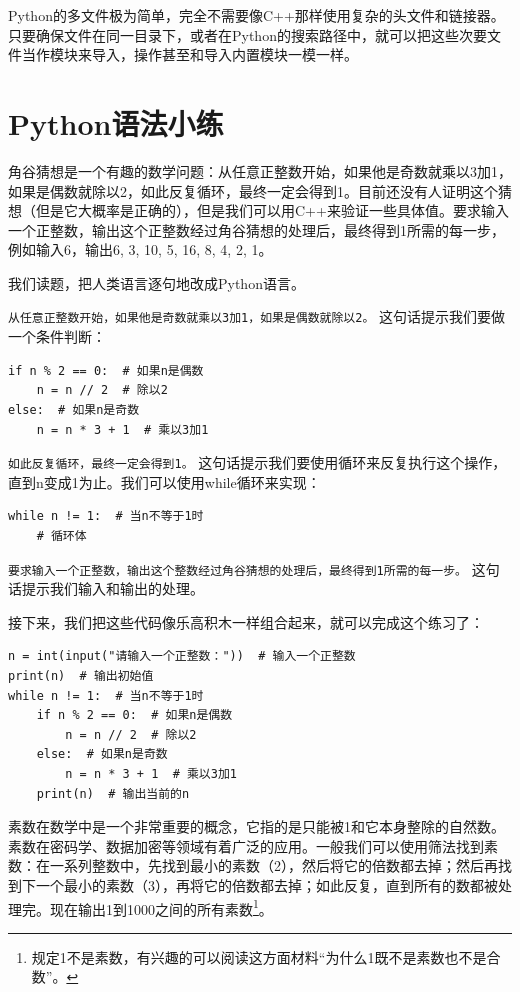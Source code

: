Python的多文件极为简单，完全不需要像C++那样使用复杂的头文件和链接器。只要确保文件在同一目录下，或者在Python的搜索路径中，就可以把这些次要文件当作模块来导入，操作甚至和导入内置模块一模一样。

\section{Python语法小练}

\begin{example}
  角谷猜想是一个有趣的数学问题：从任意正整数开始，如果他是奇数就乘以3加1，如果是偶数就除以2，如此反复循环，最终一定会得到1。目前还没有人证明这个猜想（但是它大概率是正确的），但是我们可以用C++来验证一些具体值。要求输入一个正整数，输出这个正整数经过角谷猜想的处理后，最终得到1所需的每一步，例如输入6，输出6, 3, 10, 5, 16, 8, 4, 2, 1。
\end{example}

\begin{answer}
  我们读题，把人类语言逐句地改成Python语言。

   \texttt{从任意正整数开始，如果他是奇数就乘以3加1，如果是偶数就除以2。} 这句话提示我们要做一个条件判断：
\begin{verbatim}
if n % 2 == 0:  # 如果n是偶数
    n = n // 2  # 除以2
else:  # 如果n是奇数
    n = n * 3 + 1  # 乘以3加1
\end{verbatim}
   \texttt{如此反复循环，最终一定会得到1。} 这句话提示我们要使用循环来反复执行这个操作，直到n变成1为止。我们可以使用while循环来实现：
\begin{verbatim}
while n != 1:  # 当n不等于1时
    # 循环体
\end{verbatim}

   \texttt{要求输入一个正整数，输出这个整数经过角谷猜想的处理后，最终得到1所需的每一步。} 这句话提示我们输入和输出的处理。

  接下来，我们把这些代码像乐高积木一样组合起来，就可以完成这个练习了：
\begin{verbatim}
n = int(input("请输入一个正整数："))  # 输入一个正整数
print(n)  # 输出初始值
while n != 1:  # 当n不等于1时
    if n % 2 == 0:  # 如果n是偶数
        n = n // 2  # 除以2
    else:  # 如果n是奇数
        n = n * 3 + 1  # 乘以3加1
    print(n)  # 输出当前的n
\end{verbatim}
\end{answer}

\begin{example}
  素数在数学中是一个非常重要的概念，它指的是只能被1和它本身整除的自然数。素数在密码学、数据加密等领域有着广泛的应用。一般我们可以使用筛法找到素数：在一系列整数中，先找到最小的素数（2），然后将它的倍数都去掉；然后再找到下一个最小的素数（3），再将它的倍数都去掉；如此反复，直到所有的数都被处理完。现在输出1到1000之间的所有素数\footnote{规定1不是素数，有兴趣的可以阅读这方面材料“为什么1既不是素数也不是合数”。}。
\end{example}

